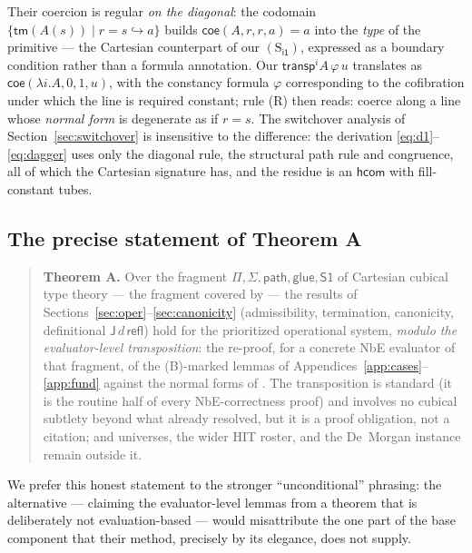 \documentclass{lmcs}
\newcommand{\transp}{\mathsf{transp}}
\newcommand{\refl}{\mathsf{refl}}
\newcommand{\J}{\mathsf{J}}
\newcommand{\ii}{\mathsf{i1}}
\begin{document}
Their coercion is regular \emph{on the diagonal}: the codomain
$\{\mathsf{tm}(A(s)) \mid r = s \hookrightarrow a\}$ builds
$\mathsf{coe}(A, r, r, a) = a$ into the \emph{type} of the primitive
--- the Cartesian counterpart of our $(\mathrm{S}_{\ii})$, expressed
as a boundary condition rather than a formula annotation.  Our
$\transp^i A\,\varphi\,u$ translates as
$\mathsf{coe}(\lambda i.A, 0, 1, u)$, with the constancy formula
$\varphi$ corresponding to the cofibration under which the line is
required constant; rule (R) then reads: coerce along a line whose
\emph{normal form} is degenerate as if $r = s$.  The switchover
analysis of Section~\ref{sec:switchover} is insensitive to the
difference: the derivation \eqref{eq:d1}--\eqref{eq:dagger} uses only
the diagonal rule, the structural path rule and congruence, all of
which the Cartesian signature has, and the residue is an
$\mathsf{hcom}$ with fill-constant tubes.

\subsection{The precise statement of Theorem A}

\begin{quote}
  \textbf{Theorem A.}  Over the fragment
  $\Pi, \Sigma, \mathsf{path}, \mathsf{glue}, \mathsf{S1}$ of
  Cartesian cubical type theory --- the fragment covered by
  \cite{SterlingAngiuli} --- the results of
  Sections~\ref{sec:oper}--\ref{sec:canonicity}
  (admissibility, termination, canonicity, definitional
  $\J\,d\,\refl$) hold for the prioritized operational system,
  \emph{modulo the evaluator-level transposition}: the re-proof, for
  a concrete NbE evaluator of that fragment, of the (B)-marked
  lemmas of Appendices~\ref{app:cases}--\ref{app:fund} against the
  normal forms of \cite{SterlingAngiuli}.  The transposition is
  standard (it is the routine half of every NbE-correctness proof)
  and involves no cubical subtlety beyond what
  \cite{SterlingAngiuli} already resolved, but it is a proof
  obligation, not a citation; and universes, the wider HIT roster,
  and the De~Morgan instance remain outside it.
\end{quote}

\noindent We prefer this honest statement to the stronger
``unconditional'' phrasing: the alternative --- claiming the
evaluator-level lemmas from a theorem that is deliberately not
evaluation-based --- would misattribute the one part of the base
component that their method, precisely by its elegance, does not
supply.
\end{document}
